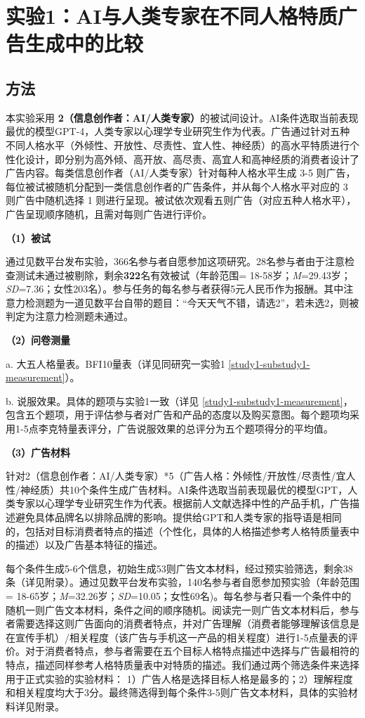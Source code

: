 \section{实验1：AI与人类专家在不同人格特质广告生成中的比较} 

\label{实验1：GPT-4与人类专家在不同人格特质广告生成中的比较}

\subsection{方法}
本实验采用 \textbf{2（信息创作者：AI/人类专家）}的被试间设计。AI条件选取当前表现最优的模型GPT-4，人类专家以心理学专业研究生作为代表。广告通过针对五种不同人格水平（外倾性、开放性、尽责性、宜人性、神经质）的高水平特质进行个性化设计，即分别为高外倾、高开放、高尽责、高宜人和高神经质的消费者设计了广告内容。每类信息创作者（AI/人类专家）针对每种人格水平生成 3-5 则广告，每位被试被随机分配到一类信息创作者的广告条件，并从每个人格水平对应的 3 则广告中随机选择 1 则进行呈现。被试依次观看五则广告（对应五种人格水平），广告呈现顺序随机，且需对每则广告进行评价。

\textbf{（1）被试}

通过见数平台发布实验，366名参与者自愿参加这项研究。28名参与者由于注意检查测试未通过被剔除，剩余\textbf{322}名有效被试（年龄范围= 18-58岁；\textit{M}=29.43岁；\textit{SD}=7.36；女性203名）。参与任务的每名参与者获得5元人民币作为报酬。其中注意力检测题为一道见数平台自带的题目：“今天天气不错，请选2”，若未选2，则被判定为注意力检测题未通过。

\textbf{（2）问卷测量}

a. 大五人格量表。BFI10量表（详见同研究一实验1 \ref{study1-substudy1-measurement}）。

b. 说服效果。具体的题项与实验1一致（详见 \ref{study1-substudy1-measurement}，包含五个题项，用于评估参与者对广告和产品的态度以及购买意图。每个题项均采用1-5点李克特量表评分，广告说服效果的总评分为五个题项得分的平均值。

\textbf{（3）广告材料}

针对2（信息创作者：AI/人类专家）*5（广告人格：外倾性/开放性/尽责性/宜人性/神经质）共10个条件生成广告材料。AI条件选取当前表现最优的模型GPT，人类专家以心理学专业研究生作为代表。根据前人文献选择中性的产品手机，广告描述避免具体品牌名以排除品牌的影响。提供给GPT和人类专家的指导语是相同的，包括对目标消费者特点的描述（个性化，具体的人格描述参考人格特质量表中的描述）以及广告基本特征的描述。

每个条件生成5-6个信息，初始生成53则广告文本材料，经过预实验筛选，剩余38条（详见附录）。通过见数平台发布实验，140名参与者自愿参加预实验（年龄范围= 18-65岁；\textit{M}=32.26岁；\textit{SD}=10.05；女性69名)。每名参与者只看一个条件中的随机一则广告文本材料，条件之间的顺序随机。阅读完一则广告文本材料后，参与者需要选择这则广告面向的消费者特点，并对广告理解（消费者能够理解该信息是在宣传手机）/相关程度（该广告与手机这一产品的相关程度）进行1-5点量表的评价。对于消费者特点，参与者需要在五个目标人格特点描述中选择与广告最相符的特点，描述同样参考人格特质量表中对特质的描述。我们通过两个筛选条件来选择用于正式实验的实验材料： 1）广告人格是选择目标人格是最多的；2）理解程度和相关程度均大于3分。最终筛选得到每个条件3-5则广告文本材料，具体的实验材料详见附录。

